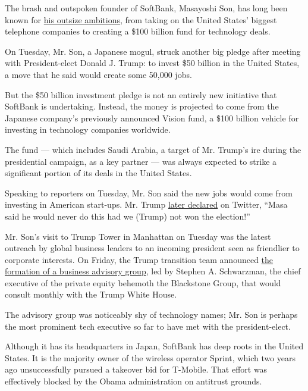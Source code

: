 The brash and outspoken founder of SoftBank, Masayoshi Son, has long
been known for
\href{https://www.nytimes.com/2016/12/04/business/dealbook/masayoshi-son-softbank-mobile.html}{his
outsize ambitions}, from taking on the United States' biggest telephone
companies to creating a \$100 billion fund for technology deals.

On Tuesday, Mr. Son, a Japanese mogul, struck another big pledge after
meeting with President-elect Donald J. Trump: to invest \$50 billion in
the United States, a move that he said would create some 50,000 jobs.

But the \$50 billion investment pledge is not an entirely new initiative
that SoftBank is undertaking. Instead, the money is projected to come
from the Japanese company's previously announced Vision fund, a \$100
billion vehicle for investing in technology companies worldwide.

The fund --- which includes Saudi Arabia, a target of Mr. Trump's ire
during the presidential campaign, as a key partner --- was always
expected to strike a significant portion of its deals in the United
States.

Speaking to reporters on Tuesday, Mr. Son said the new jobs would come
from investing in American start-ups. Mr. Trump
\href{https://twitter.com/realDonaldTrump/status/806214236053667842}{later
declared} on Twitter, ``Masa said he would never do this had we (Trump)
not won the election!''

Mr. Son's visit to Trump Tower in Manhattan on Tuesday was the latest
outreach by global business leaders to an incoming president seen as
friendlier to corporate interests. On Friday, the Trump transition team
announced
\href{https://www.nytimes.com/2016/12/02/business/dealbook/silicon-valley-chiefs-absent-trump-cabinet-of-business-advisers.html}{the
formation of a business advisory group}, led by Stephen A. Schwarzman,
the chief executive of the private equity behemoth the Blackstone Group,
that would consult monthly with the Trump White House.

The advisory group was noticeably shy of technology names; Mr. Son is
perhaps the most prominent tech executive so far to have met with the
president-elect.

Although it has its headquarters in Japan, SoftBank has deep roots in
the United States. It is the majority owner of the wireless operator
Sprint, which two years ago unsuccessfully pursued a takeover bid for
T-Mobile. That effort was effectively blocked by the Obama
administration on antitrust grounds.


